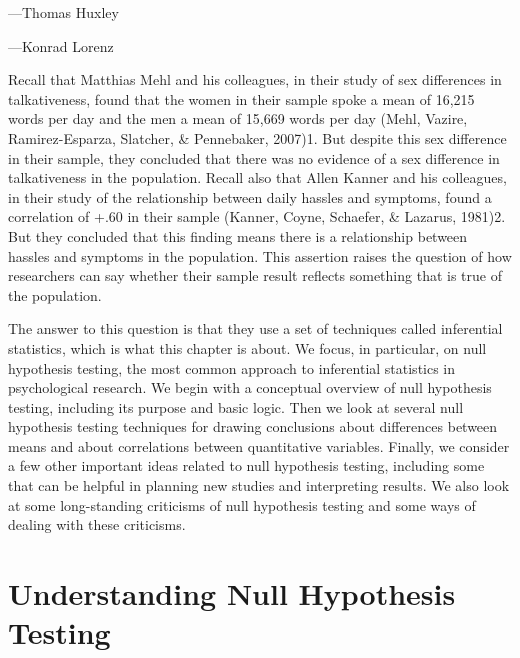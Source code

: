  {---Thomas Huxley}

 {---Konrad Lorenz}

Recall that Matthias Mehl and his colleagues, in their study of sex differences in talkativeness, found that the women in their sample spoke a mean of 16,215 words per day and the men a mean of 15,669 words per day (Mehl, Vazire, Ramirez-Esparza, Slatcher, \& Pennebaker, 2007)1. But despite this sex difference in their sample, they concluded that there was no evidence of a sex difference in talkativeness in the population. Recall also that Allen Kanner and his colleagues, in their study of the relationship between daily hassles and symptoms, found a correlation of +.60 in their sample (Kanner, Coyne, Schaefer, \& Lazarus, 1981)2. But they concluded that this finding means there is a relationship between hassles and symptoms in the population. This assertion raises the question of how researchers can say whether their sample result reflects something that is true of the population.


The answer to this question is that they use a set of techniques called inferential statistics, which is what this chapter is about. We focus, in particular, on null hypothesis testing, the most common approach to inferential statistics in psychological research. We begin with a conceptual overview of null hypothesis testing, including its purpose and basic logic. Then we look at several null hypothesis testing techniques for drawing conclusions about differences between means and about correlations between quantitative variables. Finally, we consider a few other important ideas related to null hypothesis testing, including some that can be helpful in planning new studies and interpreting results. We also look at some long-standing criticisms of null hypothesis testing and some ways of dealing with these criticisms.


\section{Understanding Null Hypothesis Testing}



